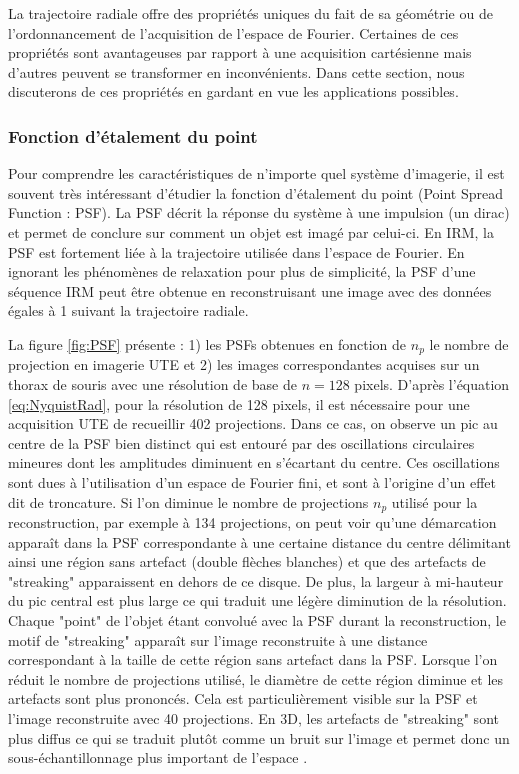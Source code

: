 La trajectoire radiale offre des propriétés uniques du fait de sa géométrie ou de l'ordonnancement de l'acquisition de l'espace de Fourier. Certaines de ces propriétés sont avantageuses par rapport à une acquisition cartésienne mais d'autres peuvent se transformer en inconvénients. Dans cette section, nous discuterons de ces propriétés en gardant en vue les applications possibles.
 
\subsubsection{Fonction d'étalement du point}

Pour comprendre les caractéristiques de n'importe quel système d'imagerie, il est souvent très intéressant d'étudier la fonction d'étalement du point (Point Spread Function : PSF). La PSF décrit la réponse du système à une impulsion (un dirac) et permet de conclure sur comment un objet est imagé par celui-ci. En IRM, la PSF est fortement liée à la trajectoire utilisée dans l'espace de Fourier. En ignorant les phénomènes de relaxation pour plus de simplicité, la PSF d'une séquence IRM peut être obtenue en reconstruisant une image avec des données égales à 1 suivant la trajectoire radiale.

La figure \ref{fig:PSF} présente : 1) les PSFs obtenues en fonction de $n_p$ le nombre de projection en imagerie UTE et 2) les images correspondantes acquises sur un thorax de souris avec une résolution de base de $n = 128$ pixels. D'après l'équation \ref{eq:NyquistRad}, pour la résolution de 128 pixels, il est nécessaire pour une acquisition UTE de recueillir 402 projections. Dans ce cas, on observe un pic au centre de la PSF bien distinct qui est entouré par des oscillations circulaires mineures dont les amplitudes diminuent en s'écartant du centre. Ces oscillations sont dues à l'utilisation d'un espace de Fourier fini, et sont à l'origine d'un effet dit de troncature. Si l'on diminue le nombre de projections $n_p$ utilisé pour la reconstruction, par exemple à 134 projections, on peut voir qu'une démarcation apparaît dans la PSF correspondante à une certaine distance du centre délimitant ainsi une région sans artefact (double flèches blanches) \cite{Scheffler:1998fk} et que des artefacts de "streaking" apparaissent en dehors de ce disque. De plus, la largeur à mi-hauteur du pic central est plus large ce qui traduit une légère diminution de la résolution. Chaque "point" de l'objet étant convolué avec la PSF durant la reconstruction, le motif de "streaking" apparaît sur l'image reconstruite à une distance correspondant à la taille de cette région sans artefact dans la PSF. Lorsque l'on réduit le nombre de projections utilisé, le diamètre de cette région diminue et les artefacts sont plus prononcés. Cela est particulièrement visible sur la PSF et l'image reconstruite avec 40 projections.
En 3D, les artefacts de "streaking" sont plus diffus ce qui se traduit plutôt comme un bruit sur l'image et permet donc un sous-échantillonnage plus important de l'espace \cite{Gu:2005aa}.

